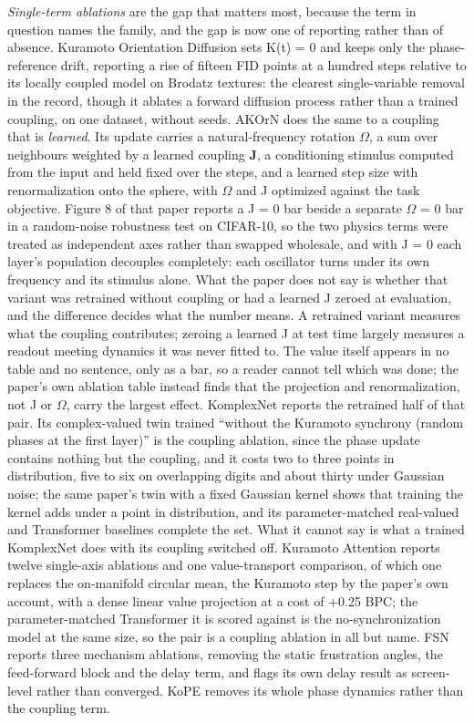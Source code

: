 \documentclass[a4paper,fleqn]{cas-sc}
\begin{document}
\emph{Single-term ablations} are the gap that matters most, because the
term in question names the family, and the gap is now one of reporting
rather than of absence. Kuramoto Orientation Diffusion
\citep{kuramoto-orientation-diffusion} sets K(t) = 0 and keeps only the
phase-reference drift, reporting a rise of fifteen FID points at a
hundred steps relative to its locally coupled model on Brodatz textures:
the clearest single-variable removal in the record, though it ablates a
forward diffusion process rather than a trained coupling, on one
dataset, without seeds. AKOrN \citep{akorn} does the same to a coupling
that is \emph{learned}. Its update carries a natural-frequency rotation
\textbf{\ensuremath{\Omega}}, a sum over neighbours weighted by a
learned coupling \textbf{J}, a conditioning stimulus computed from the
input and held fixed over the steps, and a learned step size with
renormalization onto the sphere, with \ensuremath{\Omega} and J
optimized against the task objective. Figure 8 of that paper reports a J
= 0 bar beside a separate \ensuremath{\Omega} = 0 bar in a random-noise
robustness test on CIFAR-10, so the two physics terms were treated as
independent axes rather than swapped wholesale, and with J = 0 each
layer's population decouples completely: each oscillator turns under its
own frequency and its stimulus alone. What the paper does not say is
whether that variant was retrained without coupling or had a learned J
zeroed at evaluation, and the difference decides what the number means.
A retrained variant measures what the coupling contributes; zeroing a
learned J at test time largely measures a readout meeting dynamics it
was never fitted to. The value itself appears in no table and no
sentence, only as a bar, so a reader cannot tell which was done; the
paper's own ablation table instead finds that the projection and
renormalization, not J or \ensuremath{\Omega}, carry the largest effect.
KomplexNet \citep{muzellec2025} reports the retrained half of that pair.
Its complex-valued twin trained ``without the Kuramoto synchrony (random
phases at the first layer)'' is the coupling ablation, since the phase
update contains nothing but the coupling, and it costs two to three
points in distribution, five to six on overlapping digits and about
thirty under Gaussian noise; the same paper's twin with a fixed Gaussian
kernel shows that training the kernel adds under a point in
distribution, and its parameter-matched real-valued and Transformer
baselines complete the set. What it cannot say is what a trained
KomplexNet does with its coupling switched off. Kuramoto Attention
\citep{kuramoto-attention} reports twelve single-axis ablations and one
value-transport comparison, of which one replaces the on-manifold
circular mean, the Kuramoto step by the paper's own account, with a
dense linear value projection at a cost of +0.25 BPC; the
parameter-matched Transformer it is scored against is the
no-synchronization model at the same size, so the pair is a coupling
ablation in all but name. FSN \citep{nunley2026} reports three mechanism
ablations, removing the static frustration angles, the feed-forward
block and the delay term, and flags its own delay result as screen-level
rather than converged. KoPE \citep{kope} removes its whole phase
dynamics rather than the coupling term.
\end{document}
